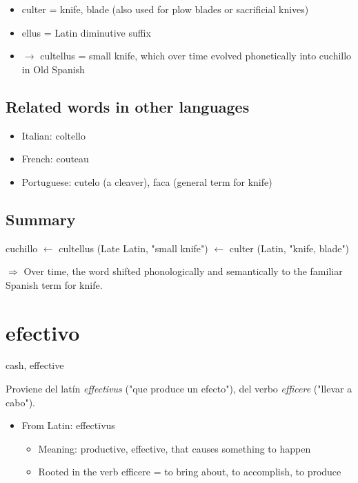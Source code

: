 \documentclass[10pt]{book}
\newcommand{\wordentry}[2]{
	\large #1
	\vspace{-0.5em}
	\begin{etymologybox}
		#2
	\end{etymologybox}
}
\let\oldsection\section
\renewcommand{\section}[1]{
	\needspace{8\baselineskip}
	\oldsection{#1}
}
\begin{document}
	\begin{itemize}
		\item culter = knife, blade (also used for plow blades or sacrificial knives)
		
		\item ellus = Latin diminutive suffix
		
		\item $\rightarrow$ cultellus = small knife, which over time evolved phonetically into cuchillo in Old Spanish
	\end{itemize}
	
	\subsection*{Related words in other languages}
	\begin{itemize}
		\item Italian: coltello
		\item French: couteau
		\item Portuguese: cutelo (a cleaver), faca (general term for knife)
	\end{itemize}
	
	\subsection{Summary}
	cuchillo $\leftarrow$ cultellus (Late Latin, "small knife") $\leftarrow$ culter (Latin, "knife, blade")
	
	$\Rightarrow$ Over time, the word shifted phonologically and semantically to the familiar Spanish term for knife.
	
	\section{efectivo}
	\wordentry{cash, effective}{
	Proviene del latín \textit{effectivus} ("que produce un efecto"), del verbo \textit{efficere} ("llevar a cabo").
	
	\begin{itemize}
		\item From Latin: effectīvus
		\begin{itemize}
			\item Meaning: productive, effective, that causes something to happen
			\item Rooted in the verb efficere = to bring about, to accomplish, to produce
		\end{itemize}
	\end{itemize}
	}
	
\end{document}
